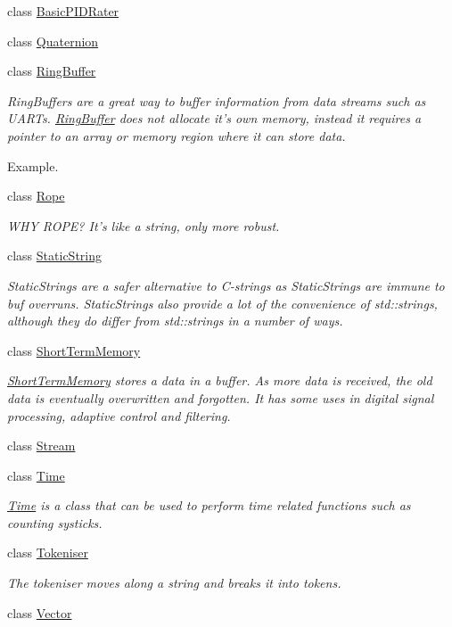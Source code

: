 \begin{DoxyCompactItemize}
\item 
class \hyperlink{classetk_1_1_basic_p_i_d_rater}{Basic\-P\-I\-D\-Rater}
\item 
class \hyperlink{classetk_1_1_quaternion}{Quaternion}
\item 
class \hyperlink{classetk_1_1_ring_buffer}{Ring\-Buffer}
\begin{DoxyCompactList}\small\item\em Ring\-Buffers are a great way to buffer information from data streams such as U\-A\-R\-Ts. \hyperlink{classetk_1_1_ring_buffer}{Ring\-Buffer} does not allocate it's own memory, instead it requires a pointer to an array or memory region where it can store data. \par
\par
 Example. \end{DoxyCompactList}\item 
class \hyperlink{classetk_1_1_rope}{Rope}
\begin{DoxyCompactList}\small\item\em W\-H\-Y R\-O\-P\-E? It's like a string, only more robust. \end{DoxyCompactList}\item 
class \hyperlink{classetk_1_1_static_string}{Static\-String}
\begin{DoxyCompactList}\small\item\em Static\-Strings are a safer alternative to C-\/strings as Static\-Strings are immune to buf overruns. Static\-Strings also provide a lot of the convenience of std\-::strings, although they do differ from std\-::strings in a number of ways. \end{DoxyCompactList}\item 
class \hyperlink{classetk_1_1_short_term_memory}{Short\-Term\-Memory}
\begin{DoxyCompactList}\small\item\em \hyperlink{classetk_1_1_short_term_memory}{Short\-Term\-Memory} stores a data in a buffer. As more data is received, the old data is eventually overwritten and forgotten. It has some uses in digital signal processing, adaptive control and filtering. \end{DoxyCompactList}\item 
class \hyperlink{classetk_1_1_stream}{Stream}
\item 
class \hyperlink{classetk_1_1_time}{Time}
\begin{DoxyCompactList}\small\item\em \hyperlink{classetk_1_1_time}{Time} is a class that can be used to perform time related functions such as counting systicks. \end{DoxyCompactList}\item 
class \hyperlink{classetk_1_1_tokeniser}{Tokeniser}
\begin{DoxyCompactList}\small\item\em The tokeniser moves along a string and breaks it into tokens. \end{DoxyCompactList}\item 
class \hyperlink{classetk_1_1_vector}{Vector}
\end{DoxyCompactItemize}
